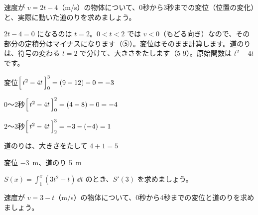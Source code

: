 \begin{reidai}
速度が $v=2t-4$（m/s）の物体について、0秒から3秒までの変位（位置の変化）と、実際に動いた道のりを求めましょう。\par
\kangaekata $2t-4=0$ になるのは $t=2$。$0<t<2$ では $v<0$（もどる向き）なので、その部分の定積分はマイナスになります（⑤）。変位はそのまま計算します。道のりは、符号の変わる $t=2$ で分けて、大きさをたします（5-9）。原始関数は $t^2-4t$ です。\par
\shiki 変位\quad $\Bigl[\,t^2-4t\,\Bigr]_0^3=(9-12)-0=-3$\par
\hspace*{2.6\zw}0〜2秒\quad $\Bigl[\,t^2-4t\,\Bigr]_0^2=(4-8)-0=-4$\par
\hspace*{2.6\zw}2〜3秒\quad $\Bigl[\,t^2-4t\,\Bigr]_2^3=-3-(-4)=1$\par
\hspace*{2.6\zw}道のりは、大きさをたして $4+1=5$\par
\kotae 変位 \qty{-3}{m}、道のり \qty{5}{m}
\end{reidai}

\noindent\begin{minipage}[t]{0.485\linewidth}\vspace{0pt}\raggedright
\begin{jibun}
$S(x)=\displaystyle\int_1^x(3t^2-t)\,\dd t$ のとき、$S'(3)$ を求めましょう。
\end{jibun}
\end{minipage}\hfill
\begin{minipage}[t]{0.485\linewidth}\vspace{0pt}\raggedright
\begin{jibun}
速度が $v=3-t$（m/s）の物体について、0秒から4秒までの変位と道のりを求めましょう。
\end{jibun}
\end{minipage}

